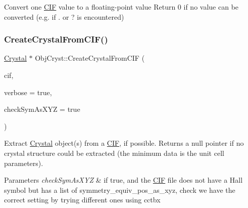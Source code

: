 Convert one \mbox{\hyperlink{class_obj_cryst_1_1_c_i_f}{C\+IF}} value to a floating-\/point value Return 0 if no value can be converted (e.\+g. if \textquotesingle{}.\textquotesingle{} or \textquotesingle{}?\textquotesingle{} is encountered) \mbox{\label{namespace_obj_cryst_a9d17f1da70d6fa8dcdd0d7ed4fb8aa17}} 
\subsubsection{\texorpdfstring{CreateCrystalFromCIF()}{CreateCrystalFromCIF()}\hspace{0.1cm}{\footnotesize\ttfamily [1/2]}}
{\footnotesize\ttfamily \mbox{\hyperlink{class_obj_cryst_1_1_crystal}{Crystal}} $\ast$ Obj\+Cryst\+::\+Create\+Crystal\+From\+C\+IF (\begin{DoxyParamCaption}\item[{\mbox{\hyperlink{class_obj_cryst_1_1_c_i_f}{C\+IF}} \&}]{cif,  }\item[{const bool}]{verbose = {\ttfamily true},  }\item[{const bool}]{check\+Sym\+As\+X\+YZ = {\ttfamily true} }\end{DoxyParamCaption})}

Extract \mbox{\hyperlink{class_obj_cryst_1_1_crystal}{Crystal}} object(s) from a \mbox{\hyperlink{class_obj_cryst_1_1_c_i_f}{C\+IF}}, if possible. Returns a null pointer if no crystal structure could be extracted (the minimum data is the unit cell parameters).


\begin{DoxyParams}{Parameters}
{\em check\+Sym\+As\+X\+YZ} & if true, and the \mbox{\hyperlink{class_obj_cryst_1_1_c_i_f}{C\+IF}} file does not have a Hall symbol but has a list of symmetry\+\_\+equiv\+\_\+pos\+\_\+as\+\_\+xyz, check we have the correct setting by trying different ones using cctbx \\
\hline
\end{DoxyParams}
\mbox{\label{namespace_obj_cryst_ababd3e4af050e9622950fa3704021332}} 
